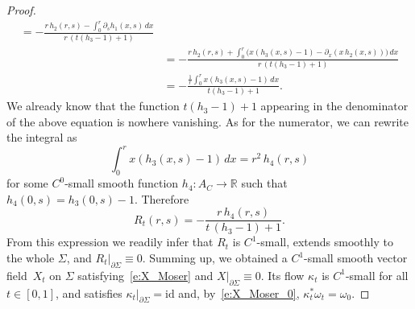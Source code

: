 \documentclass[10pt,a4paper]{article}
\let\mathds\mathbb
\theoremstyle{definition}
\newcommand{\id}{\mathrm{id}}
\newcommand{\R}{\mathds{R}}
\let\diff d
\begin{document}
\begin{proof}
\begin{align*}
=
-\frac {r\, h_2(r,s) -\int_0^r \partial_s h_1(x,s)\,\diff x}{r\,(t(h_3-1)+1)}\\
&=
-\frac {r\, h_2(r,s) +\int_0^r \big(x (h_3(x,s) - 1) - \partial_x(x\, h_2(x,s))\big)\,\diff x}{r\,(t(h_3-1)+1)}\\
&=
-\frac {\tfrac1r\int_0^r x (h_3(x,s) - 1) \,\diff x}{t(h_3-1)+1}.
\end{align*}
We already know that the function $t(h_3-1)+1$ appearing in the denominator of the above equation is nowhere vanishing. As for the numerator, we can rewrite the integral as
\[
\int_0^r x (h_3(x,s) - 1) \,\diff x = r^2\, h_4(r,s)
\]
for some $C^0$-small smooth function $h_4:A_C\to\R$ such that $h_4(0,s)=h_3(0,s) - 1$. Therefore
\[
R_t(r,s) = -\frac {r\,h_4(r,s)}{t\,(h_3-1)+1}.
\]
From this expression we readily infer that $R_t$ is $C^1$-small, extends smoothly to the whole $\Sigma$, and $R_t|_{\partial\Sigma}\equiv0$. Summing up, we obtained a $C^1$-small smooth vector field~$X_t$ on $\Sigma$ satisfying~\eqref{e:X_Moser} and $X|_{\partial\Sigma}\equiv0$.
Its flow $\kappa_t$ is $C^1$-small for all $t\in[0,1]$, and satisfies $\kappa_t|_{\partial\Sigma}=\id$ and, by~\eqref{e:X_Moser_0}, $\kappa_t^*\omega_t=\omega_0$.
\end{proof}
\end{document}
